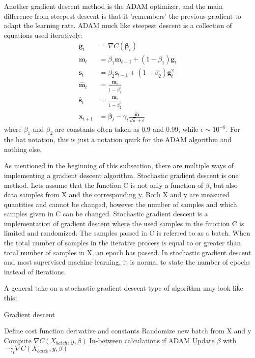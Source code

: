\documentclass[uio,jmp,amsmath,amssymb,reprint,nofootinbib]{revtex4-1}
\numberwithin{equation}{section}
\begin{document}
Another gradient descent method is the ADAM optimizer, and the main difference from steepest descent is that it 'remembers' the previous gradient to adapt the learning rate. ADAM much like steepest descent is a collection of equations used 
iteratively:
\begin{align}
\bm{g}_t &= \nabla C(\bm{\beta}_t)\\
\bm{m}_t &= \beta_1\bm{m}_{t-1} + (1-\beta_1)\bm{g}_t\\
\bm{s}_t &= \beta_2\bm{s}_{t-1} + (1-\beta_2)\bm{g}_t^2\\
\bm{\hat{m}}_t &= \frac{\bm{m}_t}{1-\beta_1^t}\\
\bm{\hat{s}}_t &= \frac{\bm{m}_t}{1-\beta_2^t}\\
\bm{x}_{t+1} &= \bm{\beta}_t - \gamma_t\frac{\bm{\hat{m}}}{\sqrt{\bm{\hat{s}}} + \epsilon}
\end{align}
where \(\beta_1\) and \(\beta_2\) are constants often taken as 0.9 and 0.99, while \(\epsilon \sim 10^{-8}\). For the hat notation, this is just a notation quirk for the ADAM algorithm and nothing else.

As mentioned in the beginning of this subsection, there are multiple ways of implementing a gradient descent algorithm. Stochastic gradient descent is one method. Lets assume that the function C is not only a function of \(\beta\), but also data samples from X and the corresponding y. Both X and y are measured quantities and cannot be changed, however the number of samples and which samples given in C can be changed. Stochastic gradient descent is a implementation of gradient descent where the used samples in the function C is limited and randomized. The samples passed in C is referred to as a batch. When the total number of samples in the iterative process is equal to or greater than total number of samples in X, an epoch has passed. In stochastic gradient descent and most supervised machine learning, it is normal to state the number of epochs instead of iterations.

A general take on a stochastic gradient descent type of algorithm may look like this:

\begin{algorithm}[H]
\caption{Gradient descent}
\begin{algorithmic}
\State Define cost function derivative and constants
\State Randomize new batch from X and y
\State Compute \(\nabla C(X_{batch}, y, \beta)\)
\State In-between calculations if ADAM
\State Update \(\beta\) with \(-\gamma_t\nabla C(X_{batch}, y, \beta)\)
\EndFor
\EndFor
\end{algorithmic}
\label{alg:01}
\end{algorithm}
\end{document}
